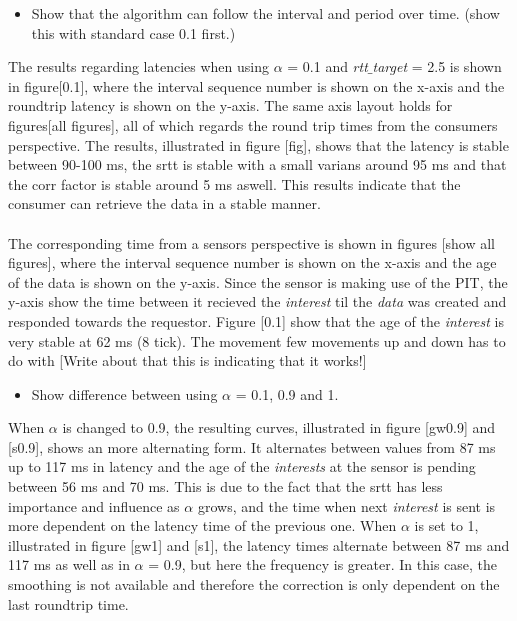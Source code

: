 \begin{itemize}
\item Show that the algorithm can follow the interval and period over time. (show this with standard case 0.1 first.)\\
\end{itemize}
The results regarding latencies when using $\alpha$ = 0.1 and \textit{rtt$\_$target} = 2.5 is shown in figure[0.1], where the interval sequence number is shown on the x-axis and the roundtrip latency is shown on the y-axis. The same axis layout holds for figures[all figures], all of which regards the round trip times from the consumers perspective. 
The results, illustrated in figure [fig], shows that the latency is stable between 90-100 ms, the srtt is stable with a small varians around 95 ms and that the corr factor is stable around 5 ms aswell. This results indicate that the consumer can retrieve the data in a stable manner.\\\\
The corresponding time from a sensors perspective is shown in figures [show all figures], where the interval sequence number is shown on the x-axis and the age of the data is shown on the y-axis. Since the sensor is making use of the PIT, the y-axis show the time between it recieved the \textit{interest} til the \textit{data} was created and responded towards the requestor. Figure [0.1] show that the age of the \textit{interest} is very stable at 62 ms (8 tick). The movement few movements up and down has to do with 
[Write about that this is indicating that it works!]


\begin{itemize}
\item Show difference between using $\alpha$ = 0.1, 0.9 and 1.
\end{itemize}
When $\alpha$ is changed to 0.9, the resulting curves, illustrated in figure [gw0.9] and [s0.9], shows an more alternating form. It alternates between values from 87 ms up to 117 ms in latency and the age of the \textit{interests} at the sensor is pending between 56 ms and 70 ms. This is due to the fact that the srtt has less importance and influence as $\alpha$ grows, and the time when next \textit{interest} is sent is more dependent on the latency time of the previous one. 
When $\alpha$ is set to 1, illustrated in figure [gw1] and [s1], the latency times alternate between 87 ms and 117 ms as well as in $\alpha$ = 0.9, but here the frequency is greater. In this case, the smoothing is not available and therefore the correction is only dependent on the last roundtrip time. 



